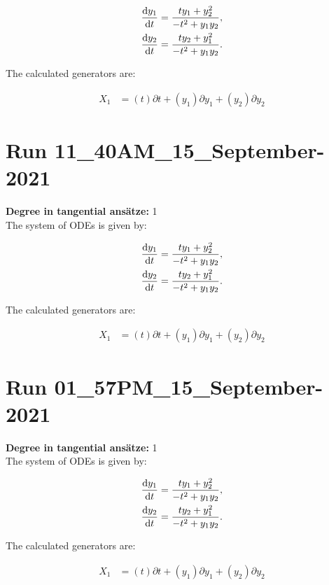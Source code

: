 \begin{align*}
\dv{y_{1}}{t}&=\frac{t y_{1} + y_{2}^{2}}{- t^{2} + y_{1} y_{2}},\\
\dv{y_{2}}{t}&=\frac{t y_{2} + y_{1}^{2}}{- t^{2} + y_{1} y_{2}}.\\
\end{align*}

\noindent The calculated generators are:

\begin{align*}
X_{1}&=\left( t \right)\partial t+\left( y_{1} \right)\partial y_{1}+\left( y_{2} \right)\partial y_{2}\end{align*}
\section*{Run 11\_40AM\_15\_September-2021}
\textbf{Degree in tangential ansätze:}	1\\
The system of ODEs is given by:

\begin{align*}
\dv{y_{1}}{t}&=\frac{t y_{1} + y_{2}^{2}}{- t^{2} + y_{1} y_{2}},\\
\dv{y_{2}}{t}&=\frac{t y_{2} + y_{1}^{2}}{- t^{2} + y_{1} y_{2}}.\\
\end{align*}

\noindent The calculated generators are:

\begin{align*}
X_{1}&=\left( t \right)\partial t+\left( y_{1} \right)\partial y_{1}+\left( y_{2} \right)\partial y_{2}\end{align*}
\section*{Run 01\_57PM\_15\_September-2021}
\textbf{Degree in tangential ansätze:}	1\\
The system of ODEs is given by:

\begin{align*}
\dv{y_{1}}{t}&=\frac{t y_{1} + y_{2}^{2}}{- t^{2} + y_{1} y_{2}},\\
\dv{y_{2}}{t}&=\frac{t y_{2} + y_{1}^{2}}{- t^{2} + y_{1} y_{2}}.\\
\end{align*}

\noindent The calculated generators are:

\begin{align*}
X_{1}&=\left( t \right)\partial t+\left( y_{1} \right)\partial y_{1}+\left( y_{2} \right)\partial y_{2}\end{align*}
